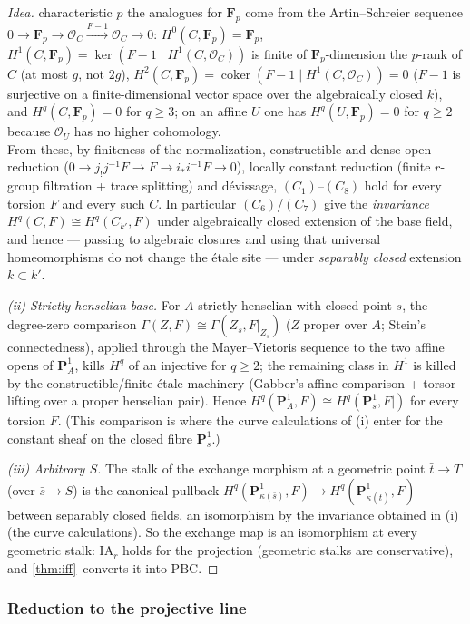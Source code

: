 \documentclass[11pt]{article}
\theoremstyle{plain}
\theoremstyle{definition}
\newcommand{\Pone}{\mathbf P^{1}}
\newcommand{\Fp}{\mathbf F_{p}}
\newcommand{\Cref}[1]{\hyperref[#1]{\ref{#1}}\,\hyperref[#1]{\nameref*{#1}}}
\begin{document}
\begin{proof}[Idea]
	characteristic $p$ the analogues for $\Fp$ come from the
	Artin--Schreier sequence
	$0\to\Fp\to\mathcal O_C\xrightarrow{F-1}\mathcal O_C\to0$:
	$H^0(C,\Fp)=\Fp$, $H^1(C,\Fp)=\ker(F-1\mid H^1(C,\mathcal O_C))$ is
	finite of $\Fp$-dimension the $p$-rank of $C$ (at most $g$, not
	$2g$), $H^2(C,\Fp)=\operatorname{coker}(F-1\mid H^1(C,\mathcal O_C))=0$
	($F-1$ is surjective on a finite-dimensional vector space over the
	algebraically closed $k$), and $H^q(C,\Fp)=0$ for $q\ge3$; on an
	affine $U$ one has $H^q(U,\Fp)=0$ for $q\ge2$ because $\mathcal O_U$
	has no higher cohomology.  
	\\From these,
	by finiteness of the normalization, constructible and dense-open
	reduction
	($0\to j_!j^{-1}F\to F\to i_*i^{-1}F\to0$), locally constant
	reduction (finite $r$-group filtration + trace splitting) and
	d\'evissage, $(C_1)$--$(C_8)$ hold for every torsion $F$ and every
	such $C$.  In particular $(C_6)$/$(C_7)$ give the \emph{invariance}
	$H^q(C,F)\cong H^q(C_{k'},F)$ under algebraically closed extension
	of the base field, and hence --- passing to algebraic closures and
	using that universal homeomorphisms do not change the \'etale site
	--- under \emph{separably closed} extension $k\subset k'$.
	
	\emph{(ii) Strictly henselian base.}  For $A$ strictly henselian
	with closed point $s$, the degree-zero comparison
	$\Gamma(Z,F)\cong\Gamma(Z_s,F|_{Z_s})$ ($Z$ proper over $A$; Stein's
	connectedness), applied through the Mayer--Vietoris sequence to the
	two affine opens of $\Pone_A$, kills $H^q$ of an injective for
	$q\ge2$; the remaining class in $H^1$ is killed by the
	constructible/finite-\'etale machinery (Gabber's affine comparison +
	torsor lifting over a proper henselian pair).  Hence
	$H^q(\Pone_A,F)\cong H^q(\Pone_s,F|)$ for every torsion $F$.  (This
	comparison is where the curve calculations of (i) enter for the
	constant sheaf on the closed fibre $\Pone_s$.)
	
	\emph{(iii) Arbitrary $S$.}  The stalk of the exchange morphism at a
	geometric point $\bar t\to T$ (over $\bar s\to S$) is the canonical
	pullback $H^q(\Pone_{\kappa(\bar s)},F)\to
	H^q(\Pone_{\kappa(\bar t)},F)$ between separably closed fields, an
	isomorphism by the invariance obtained in (i) (the curve
	calculations).  So the exchange map is an isomorphism at every
	geometric stalk: $\mathrm{IA}_r$ holds for the projection (geometric
	stalks are conservative), and \Cref{thm:iff} converts it into
	$\mathrm{PBC}$.
\end{proof}
\subsubsection{Reduction to the projective line}
\end{document}
